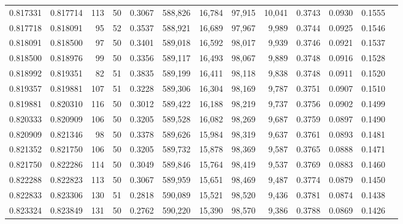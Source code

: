 \begin{tabular}{rrrrrrrrrrrrr}
0.817331 & 0.817714 &   113 &  50 &                                     0.3067 & 588,826 &  16,784 &  97,915 &  10,041 & 0.3743 & 0.0930 & 0.1555 \\
0.817718 & 0.818091 &    95 &  52 &                                     0.3537 & 588,921 &  16,689 &  97,967 &   9,989 & 0.3744 & 0.0925 & 0.1546 \\
0.818091 & 0.818500 &    97 &  50 &                                     0.3401 & 589,018 &  16,592 &  98,017 &   9,939 & 0.3746 & 0.0921 & 0.1537 \\
0.818500 & 0.818976 &    99 &  50 &                                     0.3356 & 589,117 &  16,493 &  98,067 &   9,889 & 0.3748 & 0.0916 & 0.1528 \\
0.818992 & 0.819351 &    82 &  51 &                                     0.3835 & 589,199 &  16,411 &  98,118 &   9,838 & 0.3748 & 0.0911 & 0.1520 \\
0.819357 & 0.819881 &   107 &  51 &                                     0.3228 & 589,306 &  16,304 &  98,169 &   9,787 & 0.3751 & 0.0907 & 0.1510 \\
0.819881 & 0.820310 &   116 &  50 &                                     0.3012 & 589,422 &  16,188 &  98,219 &   9,737 & 0.3756 & 0.0902 & 0.1499 \\
0.820333 & 0.820909 &   106 &  50 &                                     0.3205 & 589,528 &  16,082 &  98,269 &   9,687 & 0.3759 & 0.0897 & 0.1490 \\
0.820909 & 0.821346 &    98 &  50 &                                     0.3378 & 589,626 &  15,984 &  98,319 &   9,637 & 0.3761 & 0.0893 & 0.1481 \\
0.821352 & 0.821750 &   106 &  50 &                                     0.3205 & 589,732 &  15,878 &  98,369 &   9,587 & 0.3765 & 0.0888 & 0.1471 \\
0.821750 & 0.822286 &   114 &  50 &                                     0.3049 & 589,846 &  15,764 &  98,419 &   9,537 & 0.3769 & 0.0883 & 0.1460 \\
0.822288 & 0.822823 &   113 &  50 &                                     0.3067 & 589,959 &  15,651 &  98,469 &   9,487 & 0.3774 & 0.0879 & 0.1450 \\
0.822833 & 0.823306 &   130 &  51 &                                     0.2818 & 590,089 &  15,521 &  98,520 &   9,436 & 0.3781 & 0.0874 & 0.1438 \\
0.823324 & 0.823849 &   131 &  50 &                                     0.2762 & 590,220 &  15,390 &  98,570 &   9,386 & 0.3788 & 0.0869 & 0.1426 \\

\end{tabular}
